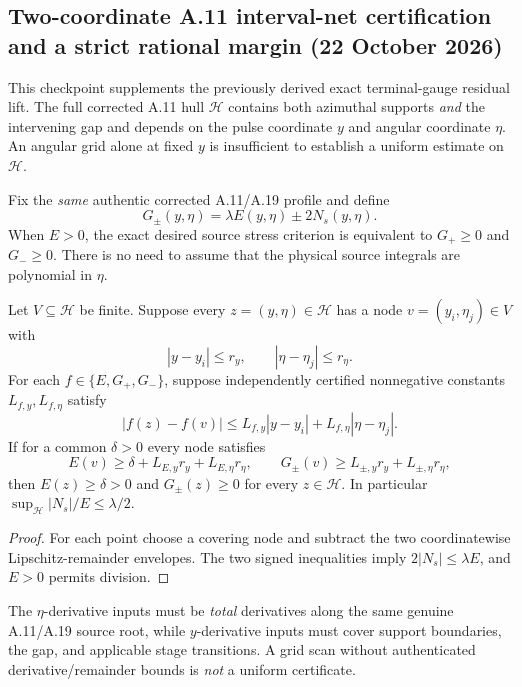 \subsection*{Two-coordinate A.11 interval-net certification and a strict rational margin (22 October 2026)}
\label{subsec:a11-two-coordinate-net-and-margin}
This checkpoint supplements the previously derived exact terminal-gauge
residual lift. The full corrected A.11 hull \(\mathcal H\) contains
both azimuthal supports \emph{and} the intervening gap and depends on
the pulse coordinate \(y\) and angular coordinate \(\eta\).
An angular grid alone at fixed \(y\) is insufficient to establish a
uniform estimate on \(\mathcal H\).

Fix the \emph{same} authentic corrected A.11/A.19 profile and define
\[
G_\pm(y,\eta)=\lambda E(y,\eta)\pm 2N_s(y,\eta).
\]
When \(E>0\), the exact desired source stress criterion is equivalent to
\(G_+\ge0\) and \(G_-\ge0\). There is no need to assume that
the physical source integrals are polynomial in \(\eta\).

\begin{proposition}
Let \(V\subseteq\mathcal H\) be finite. Suppose every
\(z=(y,\eta)\in\mathcal H\) has a node \(v=(y_i,\eta_j)\in V\) with
\[
|y-y_i|\le r_y,\qquad|\eta-\eta_j|\le r_\eta.
\]
For each \(f\in\{E,G_+,G_-\}\), suppose independently certified
nonnegative constants \(L_{f,y},L_{f,\eta}\) satisfy
\[
|f(z)-f(v)|\le L_{f,y}|y-y_i|+
                    L_{f,\eta}|\eta-\eta_j|.
\]
If for a common \(\delta>0\) every node satisfies
\[
E(v)\ge\delta+L_{E,y}r_y+L_{E,\eta}r_\eta,\qquad
G_\pm(v)\ge L_{\pm,y}r_y+L_{\pm,\eta}r_\eta,
\]
then \(E(z)\ge\delta>0\) and \(G_\pm(z)\ge0\)
for every \(z\in\mathcal H\). In particular
\(\sup_{\mathcal H}|N_s|/E\le\lambda/2\).
\end{proposition}
\begin{proof}
For each point choose a covering node and subtract the
two coordinatewise Lipschitz-remainder envelopes. The two signed
inequalities imply \(2|N_s|\le\lambda E\), and \(E>0\)
permits division.
\end{proof}
The \(\eta\)-derivative inputs must be \emph{total} derivatives along the
same genuine A.11/A.19 source root, while \(y\)-derivative inputs must
cover support boundaries, the gap, and applicable stage transitions.
A grid scan without authenticated derivative/remainder bounds is
\emph{not} a uniform certificate.


